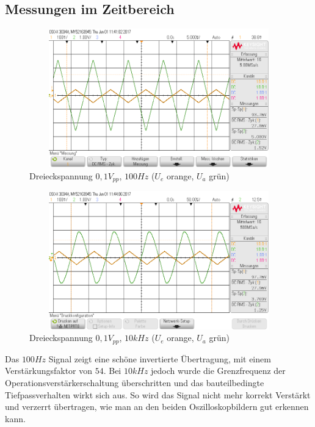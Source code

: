 \subsection{Messungen im Zeitbereich}
\begin{figure}[H]
 \begin{center}
  \includegraphics[height=6cm,width=12cm]{OsziBilder/InvVer_100Hz}
 \end{center}
 \caption{Dreieckspannung $0,1V_{pp}$, $100Hz$ ($U_e$ orange, $U_a$ grün)}
\end{figure}

\begin{figure}[H]
 \begin{center}
  \includegraphics[height=6cm,width=12cm]{OsziBilder/InvVer_10kHz}
 \end{center}
 \caption{Dreieckspannung $0,1V_{pp}$, $10kHz$ ($U_e$ orange, $U_a$ grün)}
\end{figure}
\noindent
Das $100Hz$ Signal zeigt eine schöne invertierte Übertragung, mit einem Verstärkungsfaktor von $54$. Bei $10kHz$ jedoch
wurde die Grenzfrequenz der Operationsverstärkerschaltung überschritten und das bauteilbedingte
Tiefpassverhalten wirkt sich aus. So wird das Signal nicht mehr korrekt Verstärkt und verzerrt übertragen, wie man an den beiden Oszilloskopbildern gut erkennen kann.\\
\newpage


